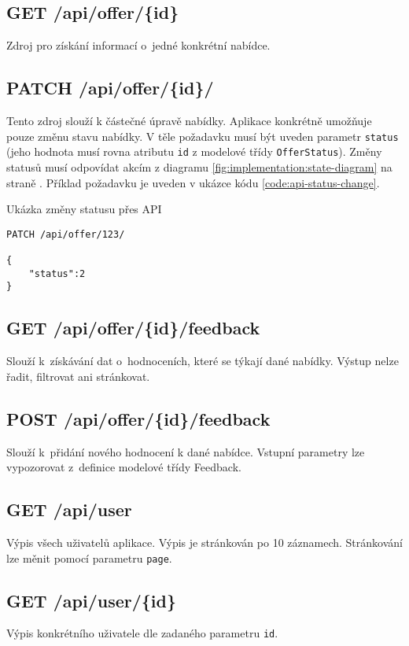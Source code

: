 \subsection{GET /api/offer/\{id\}}
Zdroj pro získání informací o~jedné konkrétní nabídce.

\subsection{PATCH /api/offer/\{id\}/}
Tento zdroj slouží k částečné úpravě nabídky. Aplikace konkrétně umožňuje pouze změnu stavu nabídky. V těle požadavku musí být uveden parametr \texttt{status} (jeho hodnota musí rovna atributu \texttt{id} z modelové třídy \texttt{OfferStatus}). Změny statusů musí odpovídat akcím z diagramu \ref{fig:implementation:state-diagram} na straně \pageref{fig:implementation:state-diagram}. Příklad požadavku je uveden v ukázce kódu \ref{code:api-status-change}.

\begin{listing}[htbp]
\caption{\label{code:api-status-change}Ukázka změny statusu přes API}
\begin{verbatim}
PATCH /api/offer/123/

{
    "status":2
}
\end{verbatim}
\end{listing}


\subsection{GET /api/offer/\{id\}/feedback}
Slouží k~získávání dat o~hodnoceních, které se týkají dané nabídky. Výstup nelze řadit, filtrovat ani stránkovat.

\subsection{POST /api/offer/\{id\}/feedback}
Slouží k~přidání nového hodnocení k dané nabídce. Vstupní parametry lze vypozorovat z~definice modelové třídy Feedback.

\subsection{GET /api/user}
Výpis všech uživatelů aplikace. Výpis je stránkován po 10 záznamech. Stránkování lze měnit pomocí parametru \texttt{page}.

\subsection{GET /api/user/\{id\}}
Výpis konkrétního uživatele dle zadaného parametru \texttt{id}.


